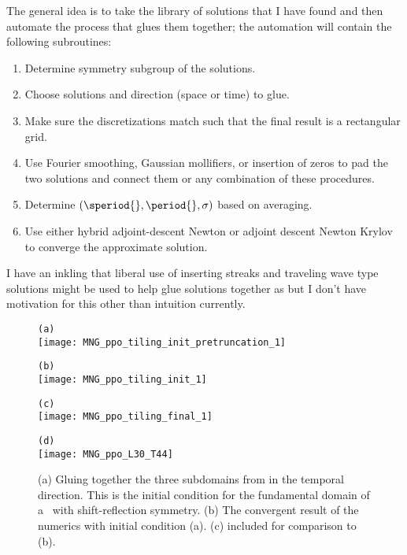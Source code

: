 The general idea is to take the library of solutions that I have found
and then automate the process that glues them together; \ie
the automation will contain the following subroutines:
\begin{enumerate}
\item Determine symmetry subgroup of the solutions.
\item Choose solutions and direction (space or time) to glue.
\item Make sure the discretizations match such that the final result
is a rectangular grid.
\item Use Fourier smoothing, Gaussian mollifiers, or insertion of
zeros to pad the two solutions and connect them or any combination
of these procedures.
\item Determine $(\speriod{},\period{},\sigma)$ based on averaging.
\item Use either hybrid adjoint-descent Newton or adjoint descent
Newton Krylov to converge the approximate solution.
\end{enumerate}

I have an inkling that liberal use of inserting streaks and traveling
wave type solutions might be used to help glue solutions together as
but I don't have motivation for this other than intuition currently.

\begin{figure}
\begin{minipage}[height=.30\textheight]{.6\textwidth}
\centering \small{\texttt{(a)}}\\
\texttt{[image: MNG\_ppo\_tiling\_init\_pretruncation\_1]}
\end{minipage}
\begin{minipage}[height=.30\textheight]{.6\textwidth}
\centering \small{\texttt{(b)}}\\
\texttt{[image: MNG\_ppo\_tiling\_init\_1]}
\end{minipage}
\begin{minipage}[height=.30\textheight]{.6\textwidth}
\centering \small{\texttt{(c)}}\\
\texttt{[image: MNG\_ppo\_tiling\_final\_1]}
\end{minipage}
\begin{minipage}[height=.30\textheight]{.6\textwidth}
\centering \small{\texttt{(d)}}\\
\texttt{[image: MNG\_ppo\_L30\_T44]}
\end{minipage}
\caption{ \label{fig:MNG_ppotiling_one}
(a) Gluing together the three subdomains from 
in the temporal direction. This is the initial condition for the fundamental domain
of a \twot\ with shift-reflection symmetry.
(b) The convergent result of the numerics with initial condition (a).
(c) 
included for comparison to (b).
}
\end{figure}



